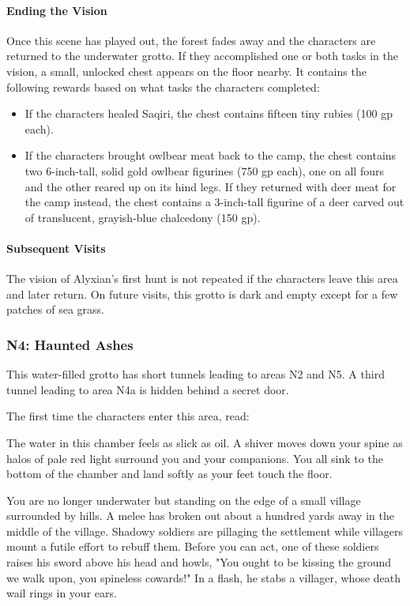 \documentclass[10pt,a4paper,twoside,twocolumn,openany,nodeprecatedcode]{dndbook}
\begin{document}
\paragraph{Ending the Vision}
Once this scene has played out, the forest fades away and the characters are returned to the underwater grotto. If they accomplished one or both tasks in the vision, a small, unlocked chest appears on the floor nearby. It contains the following rewards based on what tasks the characters completed:


\begin{itemize}
\item If the characters healed Saqiri, the chest contains fifteen tiny rubies (100 gp each).
\item If the characters brought owlbear meat back to the camp, the chest contains two 6-inch-tall, solid gold owlbear figurines (750 gp each), one on all fours and the other reared up on its hind legs. If they returned with deer meat for the camp instead, the chest contains a 3-inch-tall figurine of a deer carved out of translucent, grayish-blue chalcedony (150 gp).
\end{itemize}

\paragraph{Subsequent Visits}
The vision of Alyxian's first hunt is not repeated if the characters leave this area and later return. On future visits, this grotto is dark and empty except for a few patches of sea grass.

\subsubsection{N4: Haunted Ashes}
This water-filled grotto has short tunnels leading to areas N2 and N5. A third tunnel leading to area N4a is hidden behind a secret door.

The first time the characters enter this area, read:

\begin{DndReadAloud}{}
The water in this chamber feels as slick as oil. A shiver moves down your spine as halos of pale red light surround you and your companions. You all sink to the bottom of the chamber and land softly as your feet touch the floor.

You are no longer underwater but standing on the edge of a small village surrounded by hills. A melee has broken out about a hundred yards away in the middle of the village. Shadowy soldiers are pillaging the settlement while villagers mount a futile effort to rebuff them. Before you can act, one of these soldiers raises his sword above his head and howls, "You ought to be kissing the ground we walk upon, you spineless cowards!" In a flash, he stabs a villager, whose death wail rings in your ears.

\end{DndReadAloud}
\end{document}
